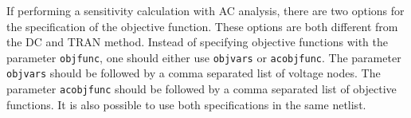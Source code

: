 \begin{Command}
If performing a sensitivity calculation with AC analysis, 
there are two options for the specification of the 
objective function. These options are both different from the DC and TRAN method.
Instead of specifying objective functions with the parameter \texttt{objfunc},
one should either use \texttt{objvars} or \texttt{acobjfunc}.  
The parameter \texttt{objvars} should be followed by a comma separated list of voltage nodes.
The parameter \texttt{acobjfunc} should be followed by a comma separated list of objective functions.
It is also possible to use both specifications in the same netlist.

\end{Command}
